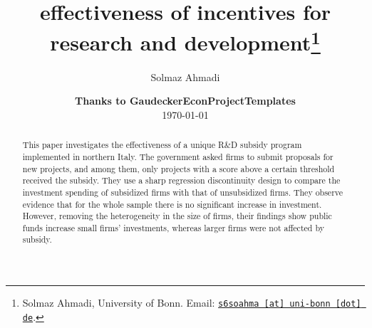 \documentclass[11pt, a4paper, leqno]{article}
\begin{document}
\title{effectiveness of incentives for research and development\thanks{Solmaz Ahmadi, University of Bonn. Email: \href{mailto:s6soahma@uni-bonn.de}{\nolinkurl{s6soahma [at] uni-bonn [dot] de}}.}}

\author{Solmaz Ahmadi}

\date{
    {\bf Thanks to GaudeckerEconProjectTemplates}
    \\[1ex]
    \today
}

\maketitle


\begin{abstract}
    This paper investigates the effectiveness of a unique R&D subsidy program implemented in northern Italy.
    The government asked firms to submit proposals for new projects, and among them, only projects with a
    score above a certain threshold received the subsidy. They use a sharp regression discontinuity design
    to compare the investment spending of subsidized firms with that of unsubsidized firms. They observe
    evidence that for the whole sample there is no significant increase in investment. However, removing the
    heterogeneity in the size of firms, their findings show public funds increase small firms' investments,
    whereas larger firms were not affected by subsidy.
\end{abstract}
\clearpage
\end{document}
